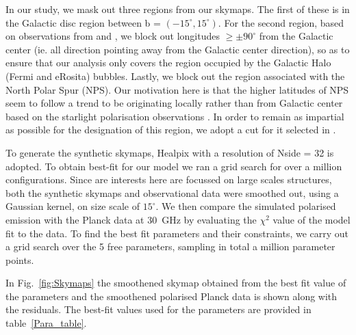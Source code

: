 \documentclass[12pt, a4 paper]{article}
\newcommand{\Andrew}[1]{\textcolor{dg}{#1}}
\newcommand{\Vasu}[1]{{\color{purple}#1}}
\begin{document}

In our study, we mask out three regions from our skymaps. The first of these is in the Galactic disc region between b = $(-15^{\circ},15^{\circ})$. For the second region, based on observations from \cite{eROSITA} and \cite{Su_2010}, we block out longitudes  $\geq \pm 90^{\circ}$ from the Galactic center (ie. all direction pointing away from the Galactic center direction), so as to ensure that our analysis only covers the region occupied by the Galactic Halo (Fermi and eRosita) bubbles. Lastly, we block out the region associated with the North Polar Spur (NPS). Our motivation here is that the higher latitudes of NPS seem to follow a trend to be originating locally rather than from Galactic center based on the starlight polarisation observations \cite{Gina_2021}. In order to remain as impartial as possible for the designation of this region, we adopt a cut for it selected in \cite{Wolleben_2007}.

To generate the synthetic skymaps, Healpix with a resolution of Nside = 32 is adopted. To obtain best-fit for our model we ran a grid search for over a million configurations. Since are interests here are focussed on large scales structures, both the synthetic skymaps and observational data were smoothed out, using a Gaussian kernel, on size scale of $15^{\circ}$. We then compare the simulated polarised emission with the Planck data at 30~GHz by evaluating the $\chi^{2}$ value of the model fit to the data. To find the best fit parameters and their constraints, we carry out a grid search over the 5 free parameters, sampling in total a million parameter points.%


In Fig.~\ref{fig:Skymaps} the smoothened skymap obtained from the best fit value of the parameters and the smoothened polarised Planck data is shown along with the residuals. The best-fit values used for the parameters are provided in table~\ref{Para_table}. 
\end{document}
